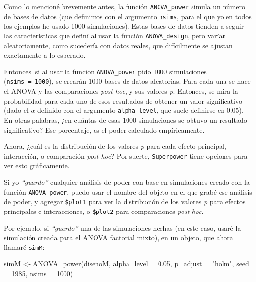 \documentclass[
]{article}
\newenvironment{Shaded}{\begin{snugshade}}{\end{snugshade}}
\newcommand{\AttributeTok}[1]{\textcolor[rgb]{0.16,0.50,0.73}{#1}}
\newcommand{\DecValTok}[1]{\textcolor[rgb]{0.96,0.45,0.00}{#1}}
\newcommand{\FloatTok}[1]{\textcolor[rgb]{0.96,0.45,0.00}{#1}}
\newcommand{\FunctionTok}[1]{\textcolor[rgb]{0.56,0.27,0.68}{#1}}
\newcommand{\NormalTok}[1]{\textcolor[rgb]{0.81,0.81,0.76}{#1}}
\newcommand{\OtherTok}[1]{\textcolor[rgb]{0.15,0.68,0.38}{#1}}
\newcommand{\StringTok}[1]{\textcolor[rgb]{0.96,0.31,0.31}{#1}}
\begin{document}
Como lo mencioné brevemente antes, la función \texttt{ANOVA\_power}
simula un número de bases de datos (que definimos con el argumento
\texttt{nsims}, para el que yo en todos los ejemplos he usado 1000
simulaciones). Estas bases de datos tienden a seguir las características
que definí al usar la función \texttt{ANOVA\_design}, pero varían
aleatoriamente, como sucedería con datos reales, que difícilmente se
ajustan exactamente a lo esperado.

Entonces, si al usar la función \texttt{ANOVA\_power} pido 1000
simulaciones (\texttt{nsims\ =\ 1000}), se crearán 1000 bases de datos
aleatorias. Para cada una se hace el ANOVA y las comparaciones
\emph{post-hoc}, y sus valores \emph{p}. Entonces, se mira la
probabilidad para cada uno de esos resultados de obtener un valor
significativo (dado el \(\alpha\) definido con el argumento
\texttt{alpha\_level}, que suele definirse en 0.05). En otras palabras,
¿en cuántas de esas 1000 simulaciones se obtuvo un resultado
significativo? Ese porcentaje, es el poder calculado empíricamente.

Ahora, ¿cuál es la distribución de los valores \emph{p} para cada efecto
principal, interacción, o comparación \emph{post-hoc}? Por suerte,
\texttt{Superpower} tiene opciones para ver esto gráficamente.

Si yo \emph{``guardo''} cualquier análisis de poder con base en
simulaciones creado con la función \texttt{ANOVA\_power}, puedo usar el
nombre del objeto en el que grabé ese análisis de poder, y agregar
\texttt{\$plot1} para ver la distribución de los valores \emph{p} para
efectos principales e interacciones, o \texttt{\$plot2} para
comparaciones \emph{post-hoc}.

Por ejemplo, si \emph{``guardo''} una de las simulaciones hechas (en
este caso, usaré la simulación creada para el ANOVA factorial mixto), en
un objeto, que ahora llamaré \texttt{simM}:

\begin{Shaded}
\begin{Highlighting}[]
\NormalTok{simM }\OtherTok{\textless{}{-}} \FunctionTok{ANOVA\_power}\NormalTok{(disenoM,}
                    \AttributeTok{alpha\_level =} \FloatTok{0.05}\NormalTok{,}
                    \AttributeTok{p\_adjust =} \StringTok{"holm"}\NormalTok{,}
                    \AttributeTok{seed =} \DecValTok{1985}\NormalTok{,}
                    \AttributeTok{nsims =} \DecValTok{1000}\NormalTok{)}
\end{Highlighting}
\end{Shaded}
\end{document}
